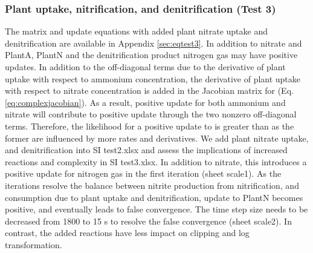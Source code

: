 \documentclass[gmd, manuscript]{copernicus}
\begin{document}
\subsubsection{Plant uptake, nitrification, and denitrification (Test 3)}
The matrix and update equations with added plant nitrate uptake and
denitrification are available in Appendix \ref{sec:eqtest3}. In addition
to nitrate and PlantA, PlantN and the denitrification product nitrogen gas may
have positive updates. In addition to the off-diagonal terms due to the derivative of plant uptake with respect to ammonium concentration, the derivative of plant uptake with respect to nitrate concentration is added in the Jacobian matrix for  (Eq. \ref{eq:complexjacobian}). As a result, positive update for both ammonium and nitrate will contribute to positive  update through the two nonzero off-diagonal terms. Therefore, the likelihood for a positive update to   is greater than  as
the former are influenced by more rates and derivatives. We add plant nitrate
uptake, and denitrification into SI test2.xlsx and
assess the implications of increased reactions and complexity in SI
test3.xlsx. In addition to nitrate, this introduces a positive update for
nitrogen gas in the first iteration (sheet scale1).
As the iterations resolve the balance between nitrite production from
nitrification, and consumption due to plant uptake and denitrification, update
to PlantN becomes positive, and eventually leads to false convergence. The time
step size needs to be decreased from 1800 to 15 \unit{s} to resolve the false
convergence (sheet scale2). In contrast, the added reactions have less
impact on clipping and log transformation. 
\end{document}
